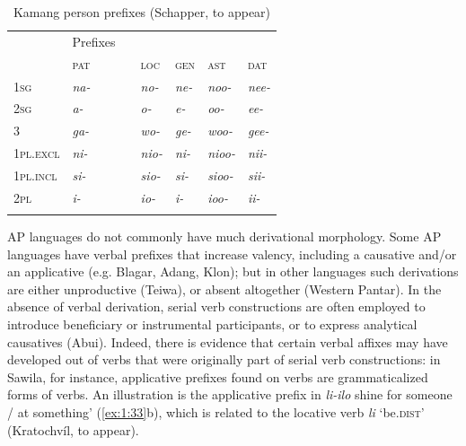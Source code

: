 {\begin{table}\centering
\begin{tabular}{lllllll}
\mytoprule
\multicolumn{1}{l}{} & \multicolumn{1}{l}{ Prefixes} & \multicolumn{5}{l}{}\\
& \multicolumn{2}{l}{{\scshape pat}} & {\scshape loc} & {\scshape gen} & \textsc{ast}\footnotemark{} & {\scshape dat}\\
\midrule 
{\scshape 1sg} & \multicolumn{2}{l}{{\itshape na-}

} & {\itshape no-} & {\itshape ne-} & {\itshape noo-} & {\itshape nee-}\\
{\scshape 2sg} & \multicolumn{2}{l}{{\itshape a-}

} & {\itshape o-} & {\itshape e-} & {\itshape oo-} & {\itshape ee-}\\
3 & \multicolumn{2}{l}{{\itshape ga-}

} & {\itshape wo-} & {\itshape ge-} & {\itshape woo-} & {\itshape gee-}\\
{\scshape 1pl.excl} & \multicolumn{2}{l}{{\itshape ni-}

} & {\itshape nio-} & {\itshape ni-} & {\itshape nioo-} & {\itshape nii-}\\
{\scshape 1pl.incl} & \multicolumn{2}{l}{{\itshape si-}

} & {\itshape sio-} & {\itshape si-} & {\itshape sioo-} & {\itshape sii-}\\
{\scshape 2pl} & \multicolumn{2}{l}{{\itshape i-}

} & {\itshape io-} & {\itshape i-} & {\itshape ioo-} & {\itshape ii-}\\
\mybottomrule
\end{tabular}

\caption{ Kamang person prefixes (Schapper, to appear)}
\label{tab:1:9}
\end{table}

AP languages do not commonly have much derivational morphology. Some AP languages have verbal prefixes that increase valency, including a causative and/or an applicative (e.g. Blagar, Adang, Klon); but in other languages such derivations are either unproductive (Teiwa), or absent altogether (Western Pantar). In the absence of verbal derivation, serial verb constructions are often employed to introduce beneficiary or instrumental participants, or to express analytical causatives (Abui). Indeed, there is evidence that certain verbal affixes may have developed out of verbs that were originally part of serial verb constructions: in Sawila, for instance, applicative prefixes found on verbs are grammaticalized forms of verbs. An illustration is the applicative prefix   in \textit{li-ilo} shine for someone / at something' (\ref{ex:1:33}b), which is related to the locative verb \textit{li} `be.\textsc{dist}' (Kratochv\'il, to appear). 


}
